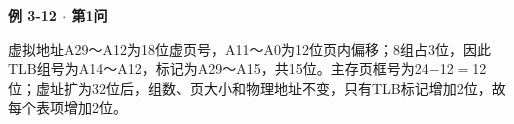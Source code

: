 {\color{ink}\bfseries 例 3-12 \(\cdot \) 第1问}\par\vspace{1bp}虚拟地址A29～A12为18位虚页号，A11～A0为12位页内偏移；8组占3位，因此TLB组号为A14～A12，标记为A29～A15，共15位。主存页框号为24\(-\)12\(=\allowbreak{}\)12位；虚址扩为32位后，组数、页大小和物理地址不变，只有TLB标记增加2位，故每个表项增加2位。
